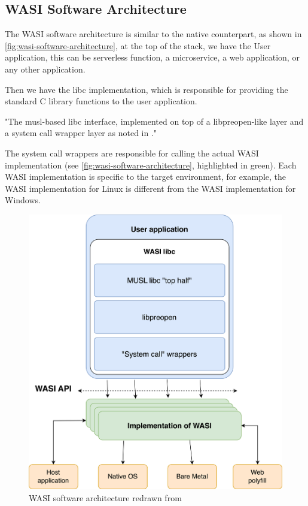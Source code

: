 \subsection{WASI Software Architecture}
\label{subsec:wasi-software-architecture}

The WASI software architecture is similar to the native counterpart, as shown in \autoref{fig:wasi-software-architecture}, at the top of the stack, we have the User application, this can be serverless function, a microservice, a web application, or any other application. 

Then we have the \gls{libc} implementation, which is responsible for providing the standard C library functions to the user application. 

"The musl-based libc interface, implemented on top of a libpreopen-like layer and a system call wrapper layer as noted in \cite[para. 1]{gohman_2019_wasi}."

The system call wrappers are responsible for calling the actual WASI implementation (see \autoref{fig:wasi-software-architecture}, highlighted in green). Each WASI implementation is specific to the target environment, for example, the WASI implementation for Linux is different from the WASI implementation for Windows. 

\begin{figure}[htbp]
	\centering
		\includegraphics[width=130mm,scale=0.8]{images/wasm/WASI_Architecture.png}
	\caption{WASI software architecture redrawn from \cite{gohman_2019_wasi}}
	\label{fig:wasi-software-architecture}
\end{figure}

